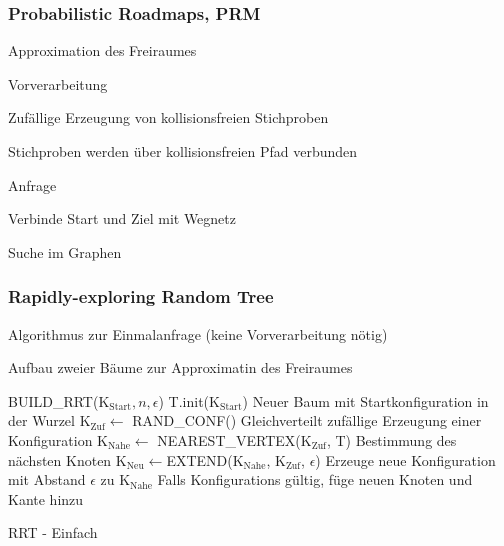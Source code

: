 \subsubsection{Probabilistic Roadmaps, PRM}
\begin{compactitem}
    \item Approximation des Freiraumes
\end{compactitem}
\begin{compactenum}
    \item Vorverarbeitung
    \begin{compactitem}
        \item Zufällige Erzeugung von kollisionsfreien Stichproben
        \item Stichproben werden über kollisionsfreien Pfad verbunden
    \end{compactitem}
    \item Anfrage
    \begin{compactitem}
        \item Verbinde Start und Ziel mit Wegnetz
        \item Suche im Graphen
    \end{compactitem}
\end{compactenum}

\subsubsection{Rapidly-exploring Random Tree}
\begin{compactitem}
    \item Algorithmus zur Einmalanfrage (keine Vorverarbeitung nötig)
    \item Aufbau zweier Bäume zur Approximatin des Freiraumes
\end{compactitem}

\begin{algorithm}[H]
    \begin{algorithmic}
        \State BUILD\_RRT(K$_\text{Start},n,\epsilon$)
        \State T.init(K$_\text{Start}$) Neuer Baum mit Startkonfiguration in der Wurzel
        \State K$_\text{Zuf} \leftarrow$ RAND\_CONF() Gleichverteilt zufällige Erzeugung einer Konfiguration
        \State K$_\text{Nahe} \leftarrow$ NEAREST\_VERTEX(K$_\text{Zuf}$, T) Bestimmung des nächsten Knoten
        \State K$_\text{Neu} \leftarrow$EXTEND(K$_\text{Nahe}$, K$_\text{Zuf}$, $\epsilon$) Erzeuge neue Konfiguration mit Abstand $\epsilon$ zu K$_\text{Nahe}$
        \State Falls Konfigurations gültig, füge neuen Knoten und Kante hinzu
        \EndFor
        \caption{RRT - Einfach}
    \end{algorithmic}
\end{algorithm}

